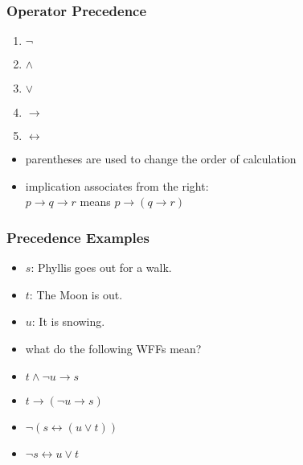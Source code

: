 \documentclass[dvipsnames]{beamer}
\begin{document}
\begin{frame}
  \frametitle{Operator Precedence}

  \begin{enumerate}
    \item $\neg$
    \item $\wedge$
    \item $\vee$
    \item $\rightarrow$
    \item $\leftrightarrow$
  \end{enumerate}

  \begin{itemize}
    \item parentheses are used to change the order of calculation
    \item implication associates from the right:\\
      $p \rightarrow q \rightarrow r$ \hspace{2em} means
      \hspace{2em} $p \rightarrow (q \rightarrow r)$
  \end{itemize}
\end{frame}

\begin{frame}
  \frametitle{Precedence Examples}

  \begin{itemize}
    \item $s$: Phyllis goes out for a walk.
    \item $t$: The Moon is out.
    \item $u$: It is snowing.
    \item what do the following WFFs mean?

    \pause
    \medskip
    \item $t \wedge \neg u \rightarrow s$
    \pause
    \item $t \rightarrow (\neg u \rightarrow s)$
    \pause
    \item $\neg (s \leftrightarrow (u \vee t))$
    \pause
    \item $\neg s \leftrightarrow u \vee t$
  \end{itemize}
\end{frame}
\end{document}
